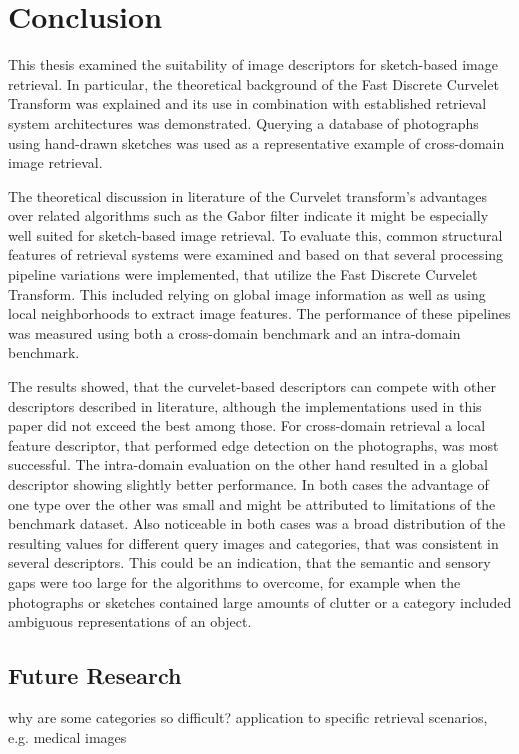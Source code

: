 \chapter{Conclusion}\label{ch:conclusion}

This thesis examined the suitability of image descriptors for sketch-based
image retrieval. In particular, the theoretical background of the Fast Discrete
Curvelet Transform was explained and its use in combination with established
retrieval system architectures was demonstrated. Querying a database of
photographs using hand-drawn sketches was used as a representative example of
cross-domain image retrieval.

The theoretical discussion in literature of the Curvelet transform's advantages
over related algorithms such as the Gabor filter indicate it might be
especially well suited for sketch-based image retrieval. To evaluate this,
common structural features of retrieval systems were examined and based on that
several processing pipeline variations were implemented, that utilize the Fast
Discrete Curvelet Transform. This included relying on global image information
as well as using local neighborhoods to extract image features. The performance
of these pipelines was measured using both a cross-domain benchmark and an
intra-domain benchmark.

The results showed, that the curvelet-based descriptors can compete with other
descriptors described in literature, although the implementations used in this
paper did not exceed the best among those. For cross-domain retrieval a local
feature descriptor, that performed edge detection on the photographs, was most
successful. The intra-domain evaluation on the other hand resulted in a global
descriptor showing slightly better performance. In both cases the advantage of
one type over the other was small and might be attributed to limitations of the
benchmark dataset. Also noticeable in both cases was a broad distribution of
the resulting values for different query images and categories, that was
consistent in several descriptors. This could be an indication, that the
semantic and sensory gaps were too large for the algorithms to overcome, for
example when the photographs or sketches contained large amounts of clutter or
a category included ambiguous representations of an object.

\section{Future Research}\label{sec:conclusion_future_research}

why are some categories so difficult?
application to specific retrieval scenarios, e.g. medical images
